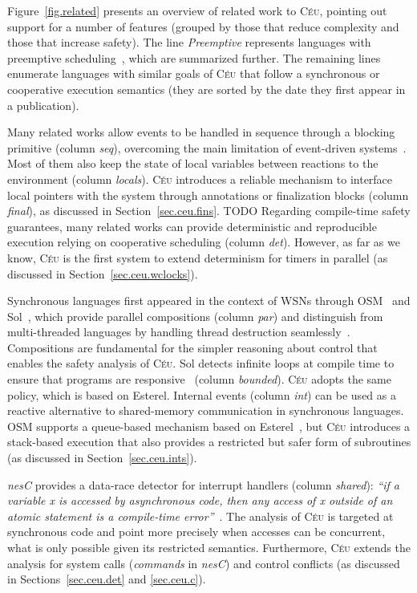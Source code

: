 \documentclass[10pt]{sensys-proc}
\newcommand{\CEU}{\textsc{C\'{e}u}\xspace}
\begin{document}
Figure~\ref{fig.related} presents an overview of related work to \CEU, pointing 
out support for a number of features (grouped by those that reduce complexity 
and those that increase safety).
The line \emph{Preemptive} represents languages with preemptive 
scheduling~\cite{wsn.mantisos,wsn.tosthreads}, which are summarized further.
The remaining lines enumerate languages with similar goals of \CEU that follow 
a synchronous or cooperative execution semantics (they are sorted by the date 
they first appear in a publication).

Many related works allow events to be handled in sequence through a blocking 
primitive (column \emph{seq}), overcoming the main limitation of event-driven 
systems~\cite{wsn.protothreads, wsn.ocram, wsn.tinythreads, wsn.flowtalk, 
wsn.sol}.
%
Most of them also keep the state of local variables between reactions to the 
environment (column \emph{locals}).
\CEU introduces a reliable mechanism to interface local pointers with the 
system through annotations or finalization blocks (column \emph{final}), as 
discussed in Section~\ref{sec.ceu.fins}.
%
TODO
Regarding compile-time safety guarantees, many related works can provide 
deterministic and reproducible execution relying on cooperative scheduling 
(column \emph{det}).
%
However, as far as we know, \CEU is the first system to extend determinism for 
timers in parallel (as discussed in Section~\ref{sec.ceu.wclocks}).

Synchronous languages first appeared in the context of WSNs through 
OSM~\cite{wsn.osm} and Sol~\cite{wsn.sol}, which provide parallel compositions 
(column \emph{par}) and distinguish from multi-threaded languages by handling 
thread destruction seamlessly~\cite{sync_async.threadsstop,esterel.preemption}.
Compositions are fundamental for the simpler reasoning about control that 
enables the safety analysis of \CEU.
%
Sol detects infinite loops at compile time to ensure that programs are 
responsive~\cite{wsn.sol} (column \emph{bounded}).
\CEU adopts the same policy, which is based on Esterel.
%
Internal events (column \emph{int}) can be used as a reactive alternative to 
shared-memory communication in synchronous languages.
OSM supports a queue-based mechanism based on Esterel~\cite{wsn.osm}, but \CEU 
introduces a stack-based execution that also provides a restricted but safer 
form of subroutines (as discussed in Section~\ref{sec.ceu.ints}).

\emph{nesC} provides a data-race detector for interrupt handlers (column 
\emph{shared}):
\emph{``if a variable x is accessed by asynchronous code, then any access of x 
outside of an atomic statement is a compile-time error''}~\cite{wsn.nesc}.
The analysis of \CEU is targeted at synchronous code and point more precisely 
when accesses can be concurrent, what is only possible given its restricted 
semantics.
Furthermore, \CEU extends the analysis for system calls (\emph{commands} in 
\emph{nesC}) and control conflicts (as discussed in Sections~\ref{sec.ceu.det} 
and \ref{sec.ceu.c}).
\end{document}
